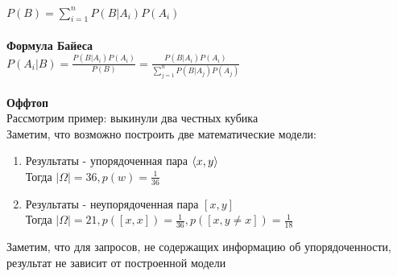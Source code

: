 \documentclass[12pt]{article}
\begin{document}
$P(B) = \sum_{i = 1}^n P(B|A_i)P(A_i)$\\\\
\textbf{Формула Байеса}\\
$P(A_i|B) = \frac{P(B|A_i)P(A_i)}{P(B)} = \frac{P(B|A_i)P(A_i)}{\sum_{j = 1}^n P(B|A_j)P(A_j)}$\\\\
\textbf{Оффтоп}\\
Рассмотрим пример: выкинули два честных кубика\\
Заметим, что возможно построить две математические модели:
\begin{enumerate}
    \item Результаты - упорядоченная пара $\langle x, y \rangle$\\
    Тогда $|\Omega| = 36, p(w) = \frac{1}{36}$
    \item Результаты - неупорядоченная пара $[ x, y ]$\\
    Тогда $|\Omega| = 21, p([x,x]) = \frac{1}{36}, p([x,y\neq x]) = \frac{1}{18}$
\end{enumerate}
Заметим, что для запросов, не содержащих информацию об упорядоченности, результат не зависит от построенной модели
\end{document}
